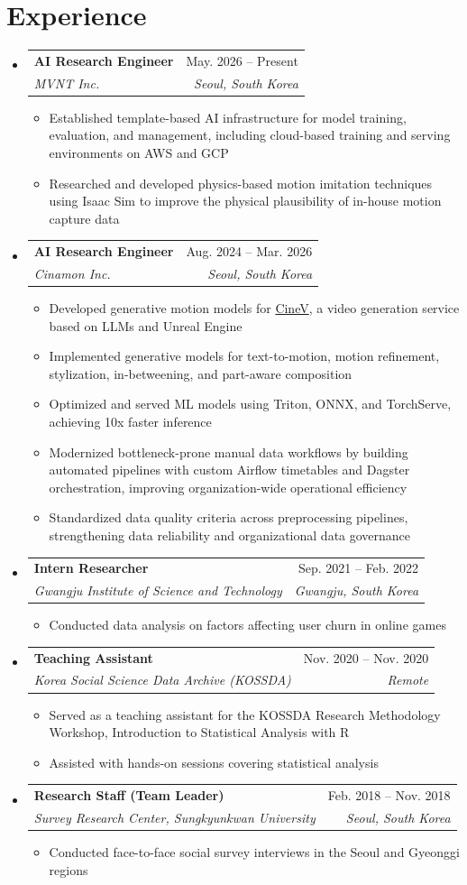 \documentclass[letterpaper,11pt]{article}
\makeatletter
\newcommand{\resumeItem}[1]{
  \item\small{
    {#1 \vspace{-2pt}}
  }
}
\newcommand{\resumeSubheading}[4]{
  \vspace{-2pt}\item
    \begin{tabular*}{0.97\textwidth}[t]{l@{\extracolsep{\fill}}r}
      \textbf{#1} & #2 \\
      \textit{\small#3} & \textit{\small #4} \\
    \end{tabular*}\vspace{-7pt}
}
\newcommand{\resumeSubHeadingListStart}{\begin{itemize}[leftmargin=0.15in, label={}]}
\newcommand{\resumeSubHeadingListEnd}{\end{itemize}}
\newcommand{\resumeItemListStart}{\begin{itemize}}
\newcommand{\resumeItemListEnd}{\end{itemize}\vspace{-5pt}}
\makeatother
\begin{document}
\section{Experience}
\resumeSubHeadingListStart
  \resumeSubheading
    {AI Research Engineer}{May. 2026 -- Present}
    {MVNT Inc.}{Seoul, South Korea}
    \resumeItemListStart
      \resumeItem{Established template-based AI infrastructure for model training, evaluation, and management, including cloud-based training and serving environments on AWS and GCP}
      \resumeItem{Researched and developed physics-based motion imitation techniques using Isaac Sim to improve the physical plausibility of in-house motion capture data}
    \resumeItemListEnd
  \resumeSubheading
    {AI Research Engineer}{Aug. 2024 -- Mar. 2026}
    {Cinamon Inc.}{Seoul, South Korea}
    \resumeItemListStart
      \resumeItem{Developed generative motion models for \href{https://cinev.com/en}{CineV}, a video generation service based on LLMs and Unreal Engine}
      \resumeItem{Implemented generative models for text-to-motion, motion refinement, stylization, in-betweening, and part-aware composition}
      \resumeItem{Optimized and served ML models using Triton, ONNX, and TorchServe, achieving 10x faster inference}
      \resumeItem{Modernized bottleneck-prone manual data workflows by building automated pipelines with custom Airflow timetables and Dagster orchestration, improving organization-wide operational efficiency}
      \resumeItem{Standardized data quality criteria across preprocessing pipelines, strengthening data reliability and organizational data governance}
    \resumeItemListEnd

  \resumeSubheading
    {Intern Researcher}{Sep. 2021 -- Feb. 2022}
    {Gwangju Institute of Science and Technology}{Gwangju, South Korea}
    \resumeItemListStart
      \resumeItem{Conducted data analysis on factors affecting user churn in online games}
    \resumeItemListEnd

  \resumeSubheading
  {Teaching Assistant}{Nov. 2020 -- Nov. 2020}
  {Korea Social Science Data Archive (KOSSDA)}{Remote}
  \resumeItemListStart
  \resumeItem{Served as a teaching assistant for the KOSSDA Research Methodology Workshop, Introduction to Statistical Analysis with R}
  \resumeItem{Assisted with hands-on sessions covering statistical analysis}
  \resumeItemListEnd

  \resumeSubheading
  {Research Staff (Team Leader)}{Feb. 2018 -- Nov. 2018}
  {Survey Research Center, Sungkyunkwan University}{Seoul, South Korea}
  \resumeItemListStart
  \resumeItem{Conducted face-to-face social survey interviews in the Seoul and Gyeonggi regions}
  \resumeItemListEnd
\resumeSubHeadingListEnd
\end{document}

